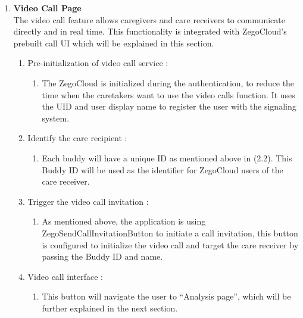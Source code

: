 \begin{enumerate}[leftmargin=2.2cm]
		\item\textbf{Video Call Page} 
		\\The video call feature allows caregivers and care receivers to communicate directly and in real time. This functionality is integrated with ZegoCloud's prebuilt call UI which will be explained in this section.
		
		\begin{enumerate}[label=\arabic*.] 
			\item Pre-initialization of video call service :
			\begin{enumerate}[label=\alph*.] 
				\item The ZegoCloud is initialized during the authentication, to reduce the time when the caretakers want to use the video calls function. It uses the UID and user display name to register the user with the signaling system.
			\end{enumerate}
			
			\item Identify the care recipient :
			\begin{enumerate}[label=\alph*.] 
				\item Each buddy will have a unique ID as mentioned above in (2.2). This Buddy ID will be used as the identifier for ZegoCloud users of the care receiver.
			\end{enumerate}
			
			\item Trigger the video call invitation :
			\begin{enumerate}[label=\alph*.] 
				\item As mentioned above, the application is using ZegoSendCallInvitationButton to initiate a call invitation, this button is configured to initialize the video call and target the care receiver by passing the Buddy ID and name. 
			\end{enumerate}
			
			\item Video call interface :
			\begin{enumerate}[label=\alph*.] 
				\item This button will navigate the user to “Analysis page”, which will be further explained in the next section.
			\end{enumerate}
		\end{enumerate}
		

\end{enumerate}

